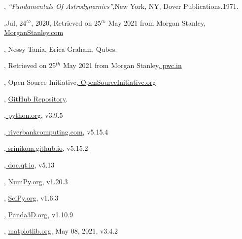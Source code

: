 \documentclass[12pt]{article}
\begin{document}
\begin{thebibliography}{99}
	,{ \textit{\enquote{Fundamentals Of Astrodynamics}}},{New York, NY},{ Dover Publications},{1971}.
	
	,{Jul, 24$^{th}$, 2020}, { Retrieved on 25$^{th}$ May 2021 from Morgan Stanley},{\href{https://www.morganstanley.com/ideas/investing-in-space}{ MorganStanley.com}}
	
	,{ Nessy Tania, Erica Graham}, {Qubes.}
	
	,{ Retrieved on 25$^{th}$ May 2021 from Morgan Stanley},{\href{https://www.pwc.in/research-insights/2020/preparing-to-scale-new-heights.html}{ pwc.in}}
	
	,{ Open Source Initiative},{\href{https://opensource.org/licenses/gpl-3.0.html}{ OpenSourceInitiative.org}}

	, {\href{https://github.com/iamlrk/MOPy}{GitHub Repository}}.
	
	,{\href{https://docs.python.org}{ python.org}},{ v3.9.5}
	
	,{\href{https://www.riverbankcomputing.com/static/Docs/PyQt5/}{ riverbankcomputing.com}},{ v5.15.4}
	
	,{\href{https://srinikom.github.io/pyside-docs/pysideapi2.html}{ srinikom.github.io}},{ v5.15.2}
	
	,{\href{https://doc.qt.io/qt-5/qtdesigner-manual.html}{ doc.qt.io}},{ v5.13}
	
	, {\href{https://numpy.org/doc}{ NumPy.org}},{ v1.20.3}
	
	, {\href{https://scipy.org/doc}{ SciPy.org}},{ v1.6.3}
	
	, {\href{https://docs.panda3d.org/1.10/python/index}{ Panda3D.org}},{ v1.10.9}
	
	, {\href{https://matplotlib.org/stable/contents.html}{ matplotlib.org}}, {May 08, 2021}, { v3.4.2}
	
\end{thebibliography}
\end{document}
